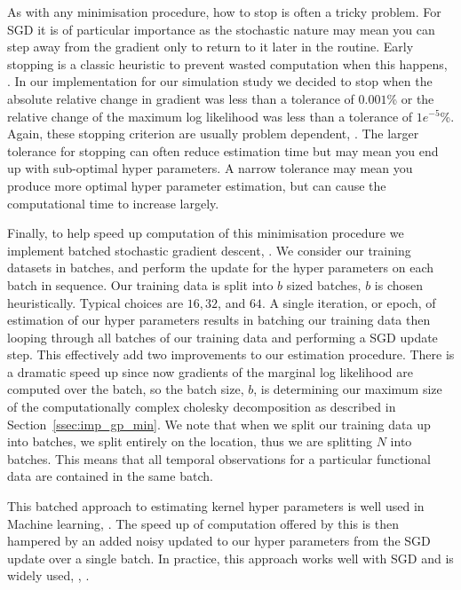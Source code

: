 As with any minimisation procedure, how to stop is often a tricky problem.
For SGD it is of particular importance as the stochastic nature may mean you can step away from the gradient only to return to it later in the routine.
Early stopping is a classic heuristic to prevent wasted computation when this happens, \citep{sra_optimization_2012}.
In our implementation for our simulation study we decided to stop when the absolute relative change in gradient was less than a tolerance of $0.001$\% or the relative change of the maximum log likelihood was less than a tolerance of $1e^{-5}$\%. 
Again, these stopping criterion are usually problem dependent, \citep{sra_optimization_2012}.
The larger tolerance for stopping can often reduce estimation time but may mean you end up with sub-optimal hyper parameters.
A narrow tolerance may mean you produce more optimal hyper parameter estimation, but can cause the computational time to increase largely.

Finally, to help speed up computation of this minimisation procedure we implement batched stochastic gradient descent, \citep{li_efficient_2014}.
We consider our training datasets in batches, and perform the update for the hyper parameters on each batch in sequence.
Our training data is split into $b$ sized batches, $b$ is chosen heuristically.
Typical choices are $16, 32$, and $64$.
A single iteration, or epoch, of estimation of our hyper parameters results in batching our training data then looping through all batches of our training data and performing a SGD update step.
This effectively add two improvements to our estimation procedure.
There is a dramatic speed up since now gradients of the marginal log likelihood are computed over the batch, so the batch size, $b$, is determining our maximum size of the computationally complex cholesky decomposition as described in Section~\ref{ssec:imp_gp_min}.
We note that when we split our training data up into batches, we split entirely on the location, thus we are splitting $N$ into batches.
This means that all temporal observations for a particular functional data are contained in the same batch.

This batched approach to estimating kernel hyper parameters is well used in Machine learning, \citep{li_efficient_2014}. 
The speed up of computation offered by this is then hampered by an added noisy updated to our hyper parameters from the SGD update over a single batch.
In practice, this approach works well with SGD and is widely used, \citep{li_efficient_2014}, \citep{sra_optimization_2012}.


